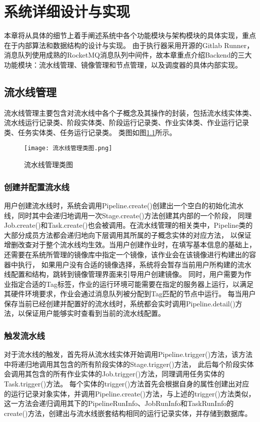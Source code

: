 
\chapter{系统详细设计与实现}
本章将从具体的细节上着手阐述系统中各个功能模块与架构模块的具体实现，重点在于内部算法和数据结构的设计与实现。
由于执行器采用开源的Gitlab Runner，消息队列使用成熟的RocketMQ消息队列中间件，故本章重点介绍Backend的三大功能模块：流水线管理、镜像管理和节点管理，以及调度器的具体内部实现。

\section{流水线管理}
流水线管理主要包含对流水线中各个子概念及其操作的封装，包括流水线实体类、流水线运行记录类、阶段实体类、阶段运行记录类、作业实体类、作业运行记录类、任务实体类、任务运行记录类。
类图如图\ref{fig:流水线管理类图}所示。
\begin{figure}[h]
  \centering
  \texttt{[image: 流水线管理类图.png]}
  \caption{流水线管理类图}
  \label{fig:流水线管理类图}
\end{figure}

\subsection{创建并配置流水线}

用户创建流水线时，系统会调用Pipeline.create()创建出一个空白的初始化流水线，同时其中会递归地调用一次Stage.create()方法创建其内部的一个阶段，
同理Job.create()和Task.create()也会被调用。在流水线管理的相关类中，Pipeline类的大部分成员方法都会递归地向下层调用其所属的子概念实体的对应方法，
以保证增删改查对于整个流水线均生效。当用户创建作业时，在填写基本信息的基础上，还需要在系统所管理的镜像库中指定一个镜像，该作业会在该镜像进行构建出的容器中执行，
如果用户没有合适的镜像选择，系统将会暂存当前用户所构建的流水线配置和结构，跳转到镜像管理界面来引导用户创建镜像。
同时，用户需要为作业指定合适的Tag标签，作业的运行环境可能需要在指定的服务器上运行，以满足其硬件环境要求，作业会通过消息队列被分配到Tag匹配的节点中运行。
每当用户保存当前已经创建并配置好的流水线时，系统都会实时调用Pipeline.detail()方法，以保证用户能够实时查看到当前的流水线配置。

\subsection{触发流水线}

对于流水线的触发，首先将从流水线实体开始调用Pipeline.trigger()方法，该方法中将递归地调用其包含的所有阶段实体的Stage.trigger()方法，
此后每个阶段实体会调用其包含的所有作业实体的Job.trigger()方法，同理调用任务实体的Task.trigger()方法。
每个实体的trigger()方法首先会根据自身的属性创建出对应的运行记录对象实体，并调用Pipeline.create()方法，与上述的trigger()方法类似，
这一方法会递归调用其下的PipelineRunInfo、JobRunInfo和TaskRunInfo的create()方法，创建出与流水线嵌套结构相同的运行记录实体，并存储到数据库。

